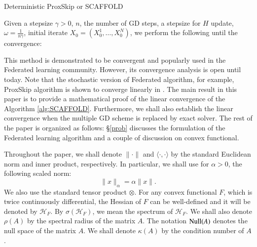 \documentclass{article}
\theoremstyle{definition}
\begin{document}
\begin{algorithm}[H]
\caption{Deterministic ProxSkip or SCAFFOLD \cite{karimireddy2020scaffold}}\label{alg:SCAFFOLD}
Given a stepsize $\gamma > 0$, $n$, the number of GD steps, a stepsize for $H$ update, 
$\omega = \frac{1}{n \gamma}$, initial iterate $X_0 = (X^1_0, \dots, X^{N}_0)$, we perform the following until the convergence:  
\begin{algorithmic}
    \EndFor    
\EndFor
\end{algorithmic}
\end{algorithm}
This method is demonstrated to be convergent and popularly used in the Federated learning community. However, its convergence analysis is open until today. Note that the stochastic version of Federated algorithm, for example, ProxSkip algorithm is shown to converge linearly in \cite{mishchenko2022proxskip}. The main result in this paper is to provide a mathematical proof of the linear convergence of the Algorithm \ref{alg:SCAFFOLD}. Furthermore, we shall also establish the linear convergence when the multiple GD scheme is replaced by exact solver. The rest of the paper is organized as follows: \S \ref{prob} discusses the formulation of the Federated learning algorithm and a couple of discussion on convex functional. 

Throughout the paper, we shall denote $\|\cdot\|$ and $\langle\cdot,\cdot\rangle$ by the standard Euclidean norm and inner product, respectively. In particular, we shall use for $\alpha > 0$, the following scaled norm: 
\begin{equation} 
\|x\|_{\alpha} = \alpha \|x\|. 
\end{equation}
We also use the standard tensor product $\otimes$. For any convex functional $F$, which is twice continuously differential, the Hessian of $F$ can be well-defined and it will be denoted by $\mathcal{H}_F$. By $\sigma(\mathcal{H}_F)$, we mean the spectrum of $\mathcal{H}_F$. We shall also denote $\rho(A)$ by the spectral radius of the matrix $A$. The notation ${\rm{Null}}(A)$ denotes the null space of the matrix $A$. We shall denote $\kappa(A)$ by the condition number of $A$.
\end{document}
